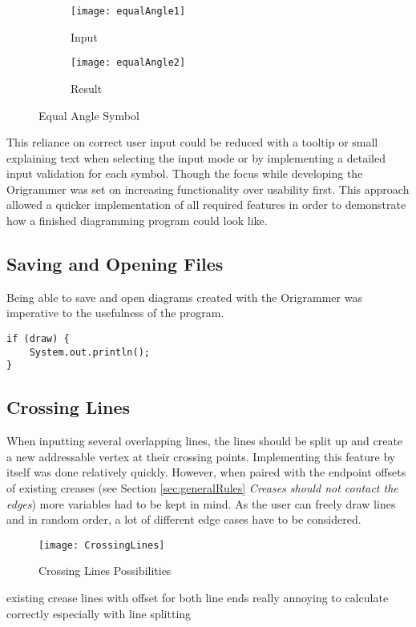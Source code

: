 \begin{figure*}[h]
    \centering
    \begin{subfigure}[b]{0.4\textwidth}
        \texttt{[image: equalAngle1]}
        \caption{Input}
        \label{fig:equalAngle1}
    \end{subfigure}
    \begin{subfigure}[b]{0.4\textwidth}
        \texttt{[image: equalAngle2]}
        \caption{Result}
        \label{fig:equalAngle2}
    \end{subfigure}
    \caption{Equal Angle Symbol}
\end{figure*}

This reliance on correct user input could be reduced with a tooltip or small explaining text when selecting the input mode or by implementing a detailed input validation for each symbol. Though the focus while developing the Origrammer was set on increasing functionality over usability first. This approach allowed a quicker implementation of all required features in order to demonstrate how a finished diagramming program could look like.


\subsection{Saving and Opening Files}

Being able to save and open diagrams created with the Origrammer was imperative to the usefulness of the program.

\begin{lstlisting}
if (draw) {
	System.out.println();
}
\end{lstlisting}


\subsection{Crossing Lines}

When inputting several overlapping lines, the lines should be split up and create a new addressable vertex at their crossing points. Implementing this feature by itself was done relatively quickly. However, when paired with the endpoint offsets of existing creases (see Section \ref{sec:generalRules} \emph{Creases should not contact the edges}) more variables had to be kept in mind. As the user can freely draw lines and in random order, a lot of different edge cases have to be considered.

\begin{figure}[h]
	\centering
	\texttt{[image: CrossingLines]}
	\caption{Crossing Lines Possibilities}
	\label{fig:crossingLines}
\end{figure}

existing crease lines with offset for both line ends
really annoying to calculate correctly especially with line splitting
						
